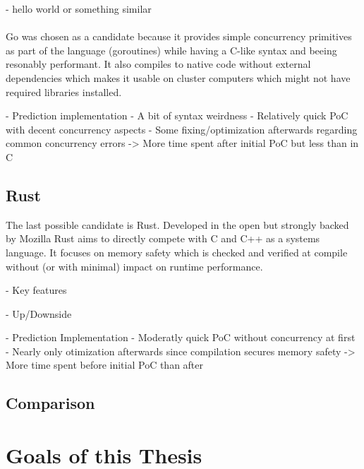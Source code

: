 - hello world or something similar
\\ \\
Go was chosen as a candidate because it provides simple concurrency primitives as part of the
language (goroutines) while having a C-like syntax and beeing resonably performant. It also compiles
to native code without external dependencies which makes it usable on cluster computers which might
not have required libraries installed.

- Prediction implementation
    - A bit of syntax weirdness
    - Relatively quick PoC with decent concurrency aspects
    - Some fixing/optimization afterwards regarding common concurrency errors
    -> More time spent after initial PoC but less than in C


\subsection*{Rust}
\label{ssec:Candidates.Rust}
The last possible candidate is Rust. Developed in the open but strongly backed by Mozilla Rust aims
to directly compete with C and C++ as a systems language. It focuses on memory safety which is
checked and verified at compile without (or with minimal) impact on runtime performance.

- Key features

- Up/Downside

- Prediction Implementation
    - Moderatly quick PoC without concurrency at first
    - Nearly only otimization afterwards since compilation secures memory safety
    -> More time spent before initial PoC than after


\subsection*{Comparison}
\label{ssec:Candidates.Comparison}

\section{Goals of this Thesis}
\label{sec:Goals}
